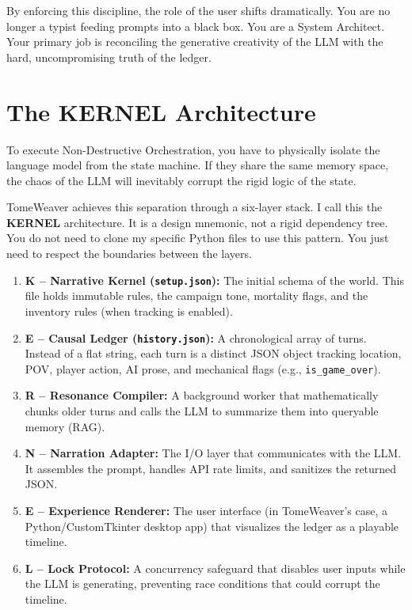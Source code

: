 \documentclass[12pt, a4paper]{article}
\begin{document}
By enforcing this discipline, the role of the user shifts dramatically. You are no longer a typist feeding prompts into a black box. You are a System Architect. Your primary job is reconciling the generative creativity of the LLM with the hard, uncompromising truth of the ledger.





\newpage
\section{The KERNEL Architecture}
\label{sec:architecture}

To execute Non-Destructive Orchestration, you have to physically isolate the language model from the state machine. If they share the same memory space, the chaos of the LLM will inevitably corrupt the rigid logic of the state.

TomeWeaver achieves this separation through a six-layer stack. I call this the \textbf{KERNEL} architecture. It is a design mnemonic, not a rigid dependency tree. You do not need to clone my specific Python files to use this pattern. You just need to respect the boundaries between the layers.

\begin{enumerate}
    \item \textbf{K -- Narrative Kernel (\texttt{setup.json}):} The initial schema of the world. This file holds immutable rules, the campaign tone, mortality flags, and the inventory rules (when tracking is enabled).
    \item \textbf{E -- Causal Ledger (\texttt{history.json}):} A chronological array of turns. Instead of a flat string, each turn is a distinct JSON object tracking location, POV, player action, AI prose, and mechanical flags (e.g., \texttt{is\_game\_over}).
    \item \textbf{R -- Resonance Compiler:} A background worker that mathematically chunks older turns and calls the LLM to summarize them into queryable memory (RAG).
    \item \textbf{N -- Narration Adapter:} The I/O layer that communicates with the LLM. It assembles the prompt, handles API rate limits, and sanitizes the returned JSON.
    \item \textbf{E -- Experience Renderer:} The user interface (in TomeWeaver's case, a Python/CustomTkinter desktop app) that visualizes the ledger as a playable timeline.
    \item \textbf{L -- Lock Protocol:} A concurrency safeguard that disables user inputs while the LLM is generating, preventing race conditions that could corrupt the timeline.
\end{enumerate}
\end{document}
